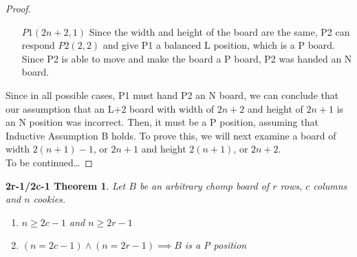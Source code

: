\documentclass[a4paper,11pt,oneside]{article}
\begin{document}
\begin{proof}
\begin{itemize}
	\item [$P1(2n+2, 1)$] Since the width and height of the board are the same, P2 can respond $P2(2, 2)$ and give P1 a balanced L position, which is a P board.  Since P2 is able to move and make the board a P board, P2 was handed an N board.
\end{itemize}
	Since in all possible cases, P1 must hand P2 an N board, we can conclude that our assumption that an L+2 board with width of $2n+2$ and height of $2n+1$ is an N position was incorrect.  Then, it must be a P position, assuming that Inductive Assumption B holds.  To prove this, we will next examine a board of width $2(n+1)-1$, or $2n+1$ and height $2(n+1)$, or $2n+2$.\\
	To be continued\dots

\end{proof}

\newtheorem{2r1theorem}{ 2r-1/2c-1 Theorem}

\begin{2r1theorem}
	Let $B$ be an arbitrary chomp board of $r$ rows, $c$ columns and $n$ cookies.
	\begin{enumerate}
		\item 	$n\geq 2c-1$ and $n\geq 2r-1$
		\item	$(n=2c-1)\land(n=2r-1) \implies B$ is a P position
	\end{enumerate}
\end{2r1theorem}
\end{document}
